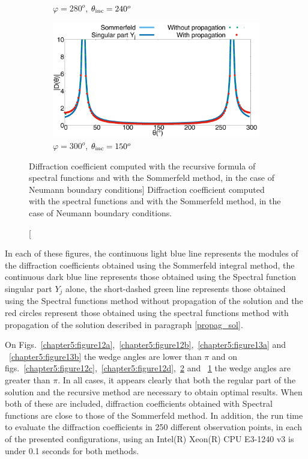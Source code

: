 \begin{figure}[h!]
\begin{subfigure}[b]{0.49\textwidth}
        \caption{$\varphi = 280^o$, $\theta_{\rm inc} = 240^o$}
        \label{chapter5:figure13d}
    \end{subfigure}
\begin{subfigure}[b]{0.49\textwidth}
        \includegraphics[width=\textwidth]{images/chapter2/Figure9d.pdf}
        \caption{$\varphi = 300^o$, $\theta_{\rm inc} = 150^o$}
        \label{chapter5:figure13c}
    \end{subfigure}
\caption
[Diffraction  coefficient computed with the recursive formula of spectral functions and with the Sommerfeld method, in the case of Neumann boundary conditions]
{Diffraction  coefficient computed with the spectral functions and with the Sommerfeld method, in the case of Neumann boundary conditions.}
\label{chapter5:figure13}
\end{figure}


 In each of these figures, the continuous light blue line represents the modules of the diffraction coefficients obtained using the Sommerfeld integral method, the continuous dark blue line represents those obtained using the Spectral function singular part $Y_j$ alone, the short-dashed green line represents those obtained using the Spectral functions method without propagation of the solution and the red circles represent those obtained using the spectral functions method with propagation of the solution described in paragraph \ref{propag_sol}.

On Figs.~\ref{chapter5:figure12a},~\ref{chapter5:figure12b},~\ref{chapter5:figure13a} and ~\ref{chapter5:figure13b} the wedge angles are lower than $\pi$ and on figs.~\ref{chapter5:figure12c},~\ref{chapter5:figure12d},~\ref{chapter5:figure13c} and ~\ref{chapter5:figure13d} the wedge angles are greater than $\pi$. In all cases, it appears clearly that both the regular part of the solution and the recursive method are necessary to obtain optimal results. When both of these are included, diffraction coefficients obtained with Spectral functions are close to those of the Sommerfeld method. In addition, the run time to evaluate the diffraction coefficients in 250 different observation points, in each of the presented configurations, using an Intel(R) Xeon(R) CPU E3-1240 v3 is under 0.1 seconds for both methods. 

